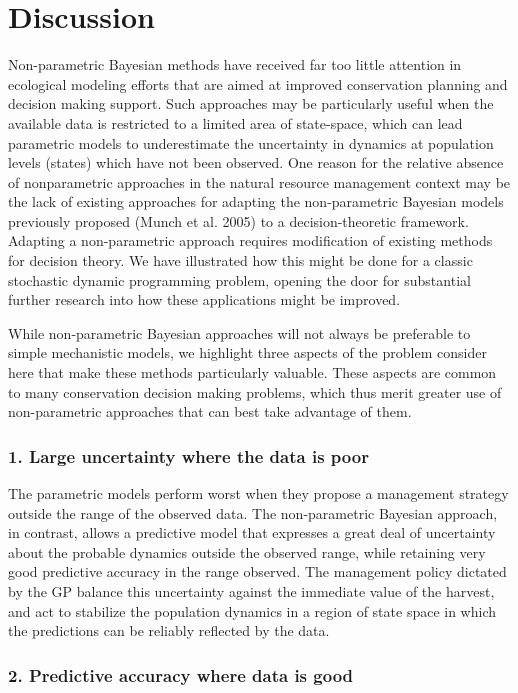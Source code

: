 \documentclass[author-year, review]{elsarticle} %
\begin{document}
\section{Discussion}

Non-parametric Bayesian methods have received far too little attention
in ecological modeling efforts that are aimed at improved conservation
planning and decision making support. Such approaches may be
particularly useful when the available data is restricted to a limited
area of state-space, which can lead parametric models to underestimate
the uncertainty in dynamics at population levels (states) which have not
been observed. One reason for the relative absence of nonparametric
approaches in the natural resource management context may be the lack of
existing approaches for adapting the non-parametric Bayesian models
previously proposed (Munch et al. 2005) to a decision-theoretic
framework. Adapting a non-parametric approach requires modification of
existing methods for decision theory. We have illustrated how this might
be done for a classic stochastic dynamic programming problem, opening
the door for substantial further research into how these applications
might be improved.

While non-parametric Bayesian approaches will not always be preferable
to simple mechanistic models, we highlight three aspects of the problem
consider here that make these methods particularly valuable. These
aspects are common to many conservation decision making problems, which
thus merit greater use of non-parametric approaches that can best take
advantage of them.

\subsubsection{1. Large uncertainty where the data is poor}

The parametric models perform worst when they propose a management
strategy outside the range of the observed data. The non-parametric
Bayesian approach, in contrast, allows a predictive model that expresses
a great deal of uncertainty about the probable dynamics outside the
observed range, while retaining very good predictive accuracy in the
range observed. The management policy dictated by the GP balance this
uncertainty against the immediate value of the harvest, and act to
stabilize the population dynamics in a region of state space in which
the predictions can be reliably reflected by the data.

\subsubsection{2. Predictive accuracy where data is good}
\end{document}
